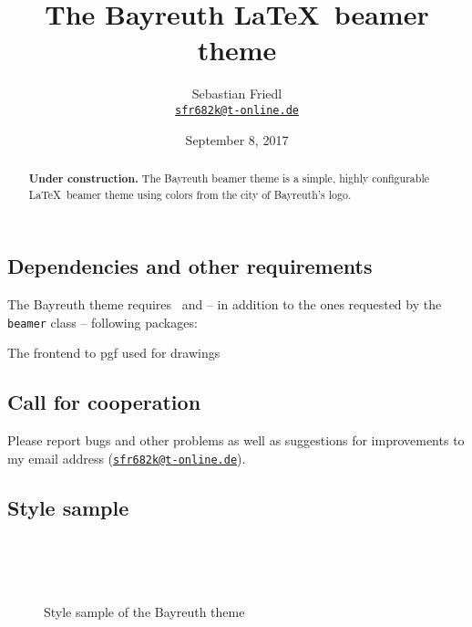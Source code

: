 \documentclass[11pt]{ltxdoc}
\title{The Bayreuth \LaTeX\ beamer theme}
\author{Sebastian Friedl \\ \href{mailto:sfr682k@t-online.de}{\texttt{sfr682k@t-online.de}}}
\date{September 8, 2017}
\begin{document}
	\maketitle
	\thispagestyle{empty}
	
	\medskip
	\begin{abstract}
		\hspace{-1.5em}%
		\textbf{Under construction.}
		The Bayreuth beamer theme is a simple, highly configurable \LaTeX\ beamer theme using colors from the city of Bayreuth's logo.
	\end{abstract}
	

	\tableofcontents

	\clearpage

	
	
	\subsection*{Dependencies and other requirements}
	The Bayreuth theme requires \LaTeXe\ and -- in addition to the ones requested by the \texttt{beamer} class -- following packages:
	
	\medskip
	The frontend to pgf used for drawings

	
	
	\subsection*{Call for cooperation}
	Please report bugs and other problems as well as suggestions for improvements to my email address (\href{mailto:sfr682k@t-online.de}{\texttt{sfr682k@t-online.de}}).
	
	
	\subsection*{Style sample}
	\begin{figure} \centering
		~~~ \\[.5em]
		~~~ \\[.5em]
		~~~ \\[.5em]
		
		\caption{Style sample of the Bayreuth theme}
		\label{stylesample}
	\end{figure}
	
\end{document}
